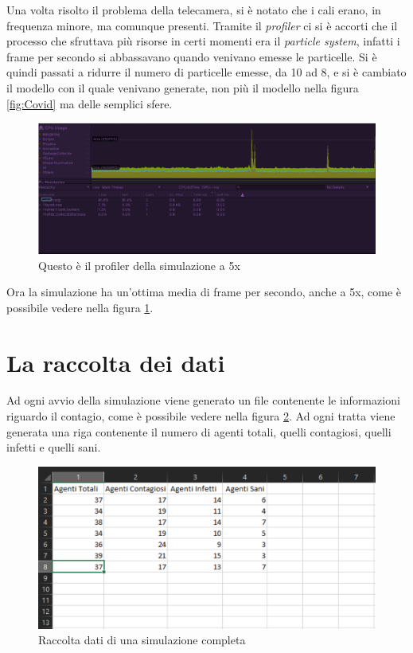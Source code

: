 \documentclass[12pt, openany]{book}
\begin{document}
 	Una volta risolto il problema della telecamera, si è notato che i cali erano, in frequenza minore, ma comunque presenti. Tramite il \emph{profiler} ci si è accorti che il processo che sfruttava più risorse in certi momenti era il \emph{particle system}, infatti i frame per secondo si abbassavano quando venivano emesse le particelle. Si è quindi passati a ridurre il numero di particelle emesse, da 10 ad 8, e si è cambiato il modello con il quale venivano generate, non più il modello nella figura \ref{fig:Covid} ma delle semplici sfere.
 	\begin{figure}[H]
 		\centering
 		\includegraphics[width=1\linewidth]{"Immagini/ProfilerBuoniFPS.png"}
 		\caption{Questo è il profiler della simulazione a 5x}
 		\label{fig:ProfilerBuoniFPS}
 	\end{figure} 
 	Ora la simulazione ha un'ottima media di frame per secondo, anche a 5x, come è possibile vedere nella figura \ref{fig:ProfilerBuoniFPS}.
 	\section{La raccolta dei dati}
 	Ad ogni avvio della simulazione viene generato un file contenente le informazioni riguardo il contagio, come è possibile vedere nella figura \ref{fig:csv}. Ad ogni tratta viene generata una riga contenente il numero di agenti totali, quelli contagiosi, quelli infetti e quelli sani.
 	\begin{figure}[H]
 		\centering
 		\includegraphics[width=1\linewidth]{"Immagini/csv.png"}
 		\caption{Raccolta dati di una simulazione completa}
 		\label{fig:csv}
 	\end{figure}
	
	
\end{document}
